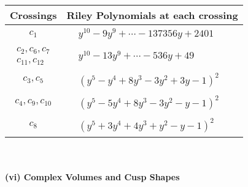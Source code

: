 \documentclass[1p]{elsarticle_modified}
\theoremstyle{definition}
\begin{document}
\begin{tabular}{m{50pt}|m{274pt}}
Crossings & \hspace{64pt}Riley Polynomials at each crossing \\
\hline $$\begin{aligned}c_{1}\end{aligned}$$&$\begin{aligned}
&y^{10}-9 y^9+\cdots-137356 y+2401
\end{aligned}$\\
\hline $$\begin{aligned}c_{2},c_{6},c_{7}\\c_{11},c_{12}\end{aligned}$$&$\begin{aligned}
&y^{10}-13 y^9+\cdots-536 y+49
\end{aligned}$\\
\hline $$\begin{aligned}c_{3},c_{5}\end{aligned}$$&$\begin{aligned}
&(y^5- y^4+8 y^3-3 y^2+3 y-1)^2
\end{aligned}$\\
\hline $$\begin{aligned}c_{4},c_{9},c_{10}\end{aligned}$$&$\begin{aligned}
&(y^5-5 y^4+8 y^3-3 y^2- y-1)^2
\end{aligned}$\\
\hline $$\begin{aligned}c_{8}\end{aligned}$$&$\begin{aligned}
&(y^5+3 y^4+4 y^3+y^2- y-1)^2
\end{aligned}$\\
\hline
\end{tabular}\\~\\
\newpage\flushleft \textbf{(vi) Complex Volumes and Cusp Shapes}
\end{document}
